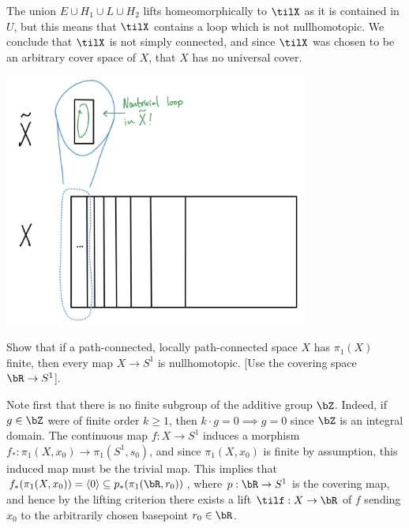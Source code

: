 \begin{homework}[e]
\begin{prf}
    The union $E \cup H_1\cup L\cup H_2$ lifts homeomorphically to $\tilX$ as it is contained in $U$, but this means that $\tilX$ contains a loop which is not nullhomotopic. We conclude that $\tilX$ is not simply connected, and since $\tilX$ was chosen to be an arbitrary cover space of $X$, that $X$ has no universal cover.

    \begin{center}
      \includegraphics[width=10cm]{figures/hwk5-fig7.png}
      \label{fig:prob5-1}
    \end{center}
  \end{prf}
   Show that if a path-connected, locally path-connected space $X$ has $\pi_1(X)$ finite, then every map $X\to S^1$ is nullhomotopic. [Use the covering space $\bR\to S^1$].
  \begin{prf}
    Note first that there is no finite subgroup of the additive group $\bZ$. Indeed, if $g \in \bZ$ were of finite order $k\geq 1$, then $k\cdot g = 0 \implies g = 0$ since $\bZ$ is an integral domain. The continuous map $f:X\to S^1$ induces a morphism $f_*:\pi_1(X,x_0)\to \pi_1(S^1,s_0)$, and since $\pi_1(X,x_0)$ is finite by assumption, this induced map must be the trivial map. This implies that $f_*(\pi_1(X,x_0)) = \langle 0 \rangle \subseteq p_*(\pi_1(\bR,r_0))$, where $p:\bR\to S^1$ is the covering map, and hence by the lifting criterion there exists a lift $\tilf:X\to \bR$ of $f$ sending $x_0$ to the arbitrarily chosen basepoint $r_0 \in \bR$. 


\end{prf}
\end{homework}

